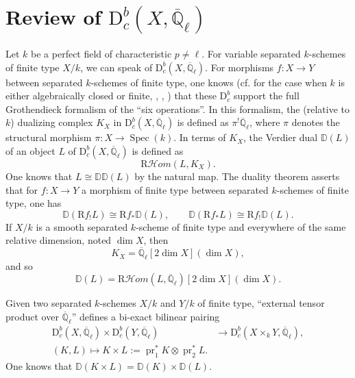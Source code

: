 \section{Review of
\texorpdfstring{\(\mathrm{D}^b_c(X,\overline{\mathbb{Q}}_\ell)\)}{Dbc(X,Qlbar)}}
\label{sec:2.2}

Let \(k\) be a perfect field of characteristic \(p\neq\ell\). For variable
separated \(k\)-schemes of finite type \(X/k\), we can speak of
\(\mathrm{D}^b_c(X,\overline{\mathbb{Q}}_\ell)\). For morphisms
\(f:X\to Y\) between separated \(k\)-schemes of finite type, one knows
(cf. \cite{De-WeilII} for the case when \(k\) is either algebraically closed or
finite, \cite{Ek}, \cite{Ka-Lau}, \cite[SGA 4, XVIII, 3]{SGA}) that these
\(\mathrm{D}^b_c\) support the full Grothendieck formalism of the ``six
operations''. In this formalism, the (relative to \(k\)) dualizing complex
\(K_X\) in \(\mathrm{D}^b_c(X,\overline{\mathbb{Q}}_\ell)\) is defined as
\(\pi^!\overline{\mathbb{Q}}_\ell\), where \(\pi\) denotes the structural
morphism \(\pi:X\to\operatorname{Spec}(k)\). In terms of \(K_X\), the Verdier
dual \(\mathbb{D}(L)\) of an object \(L\) of
\(\mathrm{D}^b_c(X,\overline{\mathbb{Q}}_\ell)\) is defined as
\[
  \mathrm{R}\mathcal{H}om(L,K_X).
\]
One knows that \(L\cong\mathbb{D}\mathbb{D}(L)\) by the natural map. The
duality theorem asserts that for \(f:X\to Y\) a morphism of finite type between
separated \(k\)-schemes of finite type, one has
\[
  \mathbb{D}(\mathrm{R}f_!L)\cong \mathrm{R}f_*\mathbb{D}(L),\qquad
  \mathbb{D}(\mathrm{R}f_*L)\cong \mathrm{R}f_!\mathbb{D}(L).
\]
If \(X/k\) is a smooth separated \(k\)-scheme of finite type and everywhere of
the same relative dimension, noted \(\dim X\), then
\[
  K_X=\overline{\mathbb{Q}}_\ell[2\dim X](\dim X),
\]
and so
\[
  \mathbb{D}(L)=
  \mathrm{R}\mathcal{H}om(L,\overline{\mathbb{Q}}_\ell)[2\dim X](\dim X).
\]

Given two separated \(k\)-schemes \(X/k\) and \(Y/k\) of finite type,
``external tensor product over \(\overline{\mathbb{Q}}_\ell\)'' defines a
bi-exact bilinear pairing
\[
\begin{aligned}
  \mathrm{D}^b_c(X,\overline{\mathbb{Q}}_\ell)
  \times
  \mathrm{D}^b_c(Y,\overline{\mathbb{Q}}_\ell)
  &\to
  \mathrm{D}^b_c(X\times_kY,\overline{\mathbb{Q}}_\ell),\\
  (K,L)\mapsto K\times L:=\operatorname{pr}_1^*K\otimes\operatorname{pr}_2^*L.
\end{aligned}
\]
One knows that \(\mathbb{D}(K\times L)=\mathbb{D}(K)\times\mathbb{D}(L)\).

